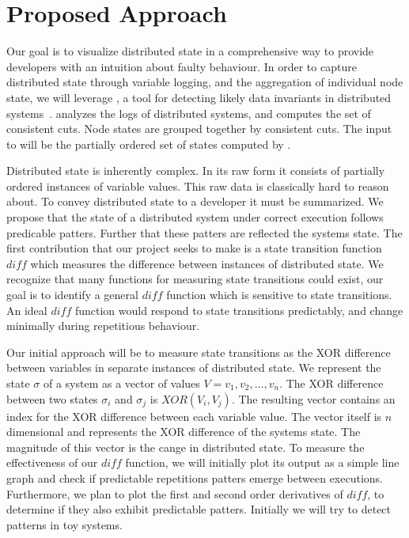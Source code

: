 \section{Proposed Approach}
\label{sec:proposed-approach}

Our goal is to visualize distributed state in a comprehensive way to
provide developers with an intuition about faulty behaviour. In order
to capture distributed state through variable logging, and the
aggregation of individual node state, we will leverage \dinv, a tool
for detecting likely data invariants in distributed
systems~\cite{dinv}. \dinv analyzes the logs of distributed systems, and computes the set of consistent cuts. Node states are grouped together by consistent cuts. The input to \dviz will be the partially ordered set of states computed by \dinv.

Distributed state is inherently complex. In its raw form it consists
of partially ordered instances of variable values. This raw data is
classically hard to reason about. To convey distributed state
to a developer it must be summarized. We propose that the state of
a distributed system under correct execution follows predicable
patters. Further that these patters are reflected the systems state.
The first contribution that our project seeks to make is a state
transition function $diff$ which measures the difference between
instances of distributed state. We recognize that many functions for
measuring state transitions could exist, our goal is to identify a general
$diff$ function which is sensitive to state transitions. An ideal $diff$ function would respond to state transitions predictably, and change minimally during repetitious behaviour.

Our initial approach will be to measure state transitions as the XOR
difference between variables in separate instances of distributed
state. We represent the state $\sigma$ of a system as a vector of
values $V = {v_1,v_2,\dots,v_n}$. The XOR difference between two
states $\sigma_i$ and $\sigma_j$ is $XOR(V_i,V_j)$. The resulting
vector contains an index for the XOR difference between each
variable value. The vector itself is $n$ dimensional and represents the XOR
difference of the systems state. The magnitude of this vector is the cange in distributed state. To measure the effectiveness of our
$diff$ function, we will initially plot its output as a simple line
graph and check if predictable repetitions patters emerge between
executions.  Furthermore, we plan to plot the first and second order
derivatives of $diff$, to determine
if they also exhibit predictable patters. Initially we will try to
detect patterns in toy systems. 


